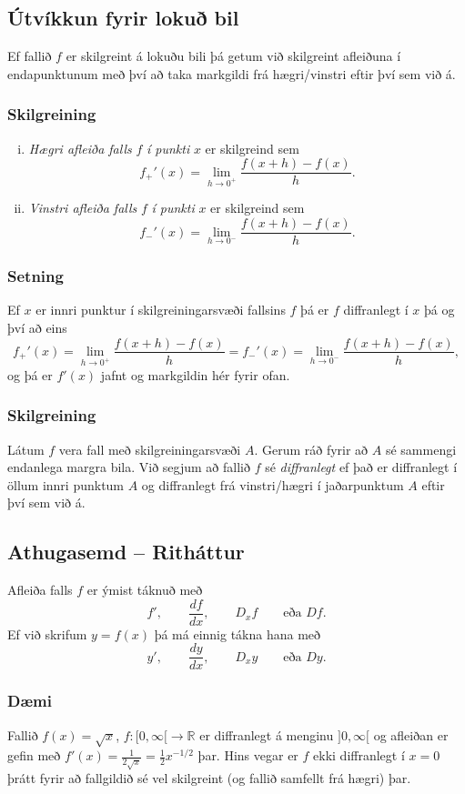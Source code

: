 \documentclass[icelandic,a4paper,12pt]{article}
\newcommand{\R}{{\mathbb  R}}
\begin{document}
\subsection{Útvíkkun fyrir lokuð bil}
 Ef fallið $f$ er skilgreint á lokuðu bili þá getum við skilgreint  afleiðuna í endapunktunum
 með því að taka markgildi frá hægri/vinstri eftir því sem við á.
 
 \subsubsection{Skilgreining}
\begin{enumerate}[(i)]
\item \emph{Hægri afleiða falls} $f$ \emph{í punkti} $x$ er skilgreind sem 
$$
	f_+'(x)=\lim_{h\rightarrow 0^+}\frac{f(x+h)-f(x)}{h}.
$$
\item \emph{Vinstri afleiða falls} $f$ \emph{í punkti} $x$ er skilgreind sem 
$$
	f_-'(x)=\lim_{h\rightarrow 0^-}\frac{f(x+h)-f(x)}{h}.
$$
\end{enumerate}

\subsubsection{Setning}
Ef $x$ er innri punktur í skilgreiningarsvæði fallsins $f$ þá er $f$ diffranlegt
í $x$ þá og því að eins
$$
	f_+'(x)=\lim_{h\rightarrow 0^+}\frac{f(x+h)-f(x)}{h}
=	f_-'(x)=\lim_{h\rightarrow 0^-}\frac{f(x+h)-f(x)}{h},
$$
og þá er $f'(x)$ jafnt og markgildin hér fyrir ofan.

\subsubsection{Skilgreining}
Látum $f$ vera fall með skilgreiningarsvæði
$A$.  Gerum ráð fyrir að $A$ sé sammengi endanlega margra bila.  Við
segjum að fallið $f$ sé \emph{diffranlegt} ef það er diffranlegt í öllum 
innri punktum $A$ og diffranlegt frá vinstri/hægri í jaðarpunktum $A$ 
eftir því sem við á.

\subsection{Athugasemd -- Ritháttur}
Afleiða falls $f$ er ýmist táknuð með
$$
  f', \qquad \frac {df}{dx}, \qquad D_x f \qquad \text{eða } Df.
$$
Ef við skrifum $y=f(x)$ þá má einnig tákna hana með 
$$
  y', \qquad \frac {dy}{dx}, \qquad D_x y \qquad \text{eða } Dy.
$$

\subsubsection{Dæmi}
Fallið $f(x) = \sqrt{x}$, $f:[0,\infty[\to \R$ er diffranlegt á 
menginu $]0,\infty[$ og afleiðan er gefin
með $f'(x) = \frac 1{2\sqrt{x}} = \frac 12 x^{-1/2}$ þar. Hins vegar er $f$ 
ekki diffranlegt í $x=0$ þrátt fyrir að fallgildið sé vel skilgreint (og fallið samfellt 
frá hægri) þar.
\end{document}

